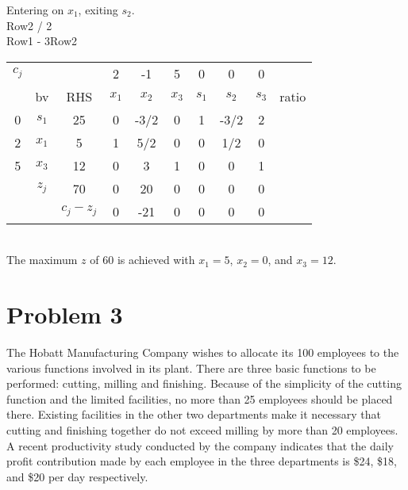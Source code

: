 \documentclass[answers]{exam}
\begin{document}
\noindent
Entering on $x_1$, exiting $s_2$. \\
Row2 / 2 \\
Row1 - 3Row2 \\

\begin{tabular}{cccccccccc}
	$c_j$                  &                            &                                & 2     & -1    & 5     & 0     & 0     & 0     &       \\
	\multicolumn{1}{c|}{}  & \multicolumn{1}{c|}{bv}    & \multicolumn{1}{c|}{RHS}       & $x_1$ & $x_2$ & $x_3$ & $s_1$ & $s_2$ & $s_3$ & ratio \\ \cline{1-9}
	\multicolumn{1}{c|}{0} & \multicolumn{1}{c|}{$s_1$} & \multicolumn{1}{c|}{25}        & 0     & -3/2  & 0     & 1     & -3/2  & 2     &       \\
	\multicolumn{1}{c|}{2} & \multicolumn{1}{c|}{$x_1$} & \multicolumn{1}{c|}{5}         & 1     & 5/2   & 0     & 0     & 1/2   & 0     &       \\
	\multicolumn{1}{c|}{5} & \multicolumn{1}{c|}{$x_3$} & \multicolumn{1}{c|}{12}        & 0     & 3     & 1     & 0     & 0     & 1     &       \\ \cline{1-9}
	& \multicolumn{1}{c|}{$z_j$} & \multicolumn{1}{c|}{70}        & 0     & 20    & 0     & 0     & 0     & 0     &       \\ \cline{3-9}
	&                            & \multicolumn{1}{c|}{$c_j-z_j$} & 0     & -21   & 0     & 0     & 0     & 0     &      
\end{tabular}\\

\noindent
The maximum $z$ of $60$ is achieved with $x_1=5$, $x_2=0$, and $x_3=12$.

\clearpage
\section{Problem 3}

The Hobatt Manufacturing Company wishes to allocate its 100 employees to the various functions involved in its plant. There are three basic functions to be performed: cutting, milling and finishing. Because of the simplicity of the cutting function and the limited facilities, no more than 25 employees should be placed there. Existing facilities in the other two departments make it necessary that cutting and finishing together do not exceed milling by more than 20 employees. A recent productivity study conducted by the company indicates that the daily profit contribution made by each employee in the three departments is \$24, \$18, and \$20 per day respectively. \bigskip
\end{document}

